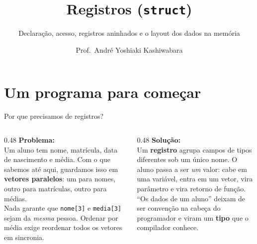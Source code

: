 \documentclass[aspectratio=169]{beamer}
\title{Registros (\texttt{struct})}
\subtitle{Declaração, acesso, registros aninhados e o layout dos dados na memória}
\author{Prof.\ André Yoshiaki Kashiwabara}
\institute{DCOMP -- Universidade Federal de Sergipe\\
\texttt{andreyoshiaki@dcomp.ufs.br}}
\date{}
\begin{document}
\begin{frame}[plain]
  \titlepage
\end{frame}

\section{Um programa para começar}

\begin{frame}{Por que precisamos de registros?}
  \begin{columns}[T]
    \begin{column}{0.48\textwidth}
      \textbf{Problema:}\\[2mm]
      Um aluno tem nome, matrícula, data de nascimento e média. Com o que
      sabemos até aqui, guardamos isso em \textbf{vetores paralelos}: um para
      nomes, outro para matrículas, outro para médias.
      \\[2mm]
      Nada garante que \texttt{nome[3]} e \texttt{media[3]} sejam da
      \emph{mesma} pessoa. Ordenar por média exige reordenar todos os vetores
      em sincronia.
    \end{column}
    \begin{column}{0.48\textwidth}
      \textbf{Solução:}\\[2mm]
      Um \textbf{registro} agrupa campos de tipos diferentes sob um único
      nome. O aluno passa a ser \emph{um} valor: cabe em uma variável, entra
      em um vetor, vira parâmetro e vira retorno de função.
      \\[2mm]
      ``Os dados de um aluno'' deixam de ser convenção na cabeça do
      programador e viram um \textbf{tipo} que o compilador conhece.
    \end{column}
  \end{columns}
\end{frame}
\end{document}
